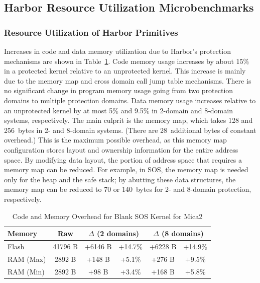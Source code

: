 \subsection{Harbor Resource Utilization Microbenchmarks}
\subsubsection{Resource Utilization of Harbor Primitives}
%
Increases in code and data memory utilization due to Harbor's
protection mechanisms are shown in
Table~\ref{tab:kernel_size_comparison}.
%
Code memory usage increases by about 15\% in a protected kernel
relative to an unprotected kernel.
%
This increase is mainly due to the memory map and cross domain call
jump table mechanisms.
%
There is no significant change in program memory usage going from two
protection domains to multiple protection domains.
%
Data memory usage increases relative to an unprotected kernel by at
most 5\% and 9.5\% in 2-domain and 8-domain systems, respectively.
%
The main culprit is the memory map, which takes 128 and 256~bytes in 2-
and 8-domain systems.  (There are 28~additional bytes of constant
overhead.)
%
This is the maximum possible overhead, as this memory map configuration
stores layout and ownership information for the entire address space.
%
%
By modifying data layout, the portion of address space that requires a
memory map can be reduced.
%
For example, in SOS, the memory map is needed only for the heap and the safe
stack; by abutting these data structures, the memory map can be
reduced to 70 or 140~bytes for 2- and 8-domain protection, respectively.
%
%
\begin{table}[htdp]
\centering
\small{\def\X{\hphantom{0}}
\begin{tabular}{|l|c|c|c|c|c|}
	\hline
	Memory & Raw & \multicolumn{2}{c|}{$\Delta$ (2 domains)} & \multicolumn{2}{c|}{$\Delta$ (8 domains)}
	\\
	\hline
	Flash\raise1pt\hbox{\strut}  & 41796 B & +6146 B & +14.7\% & +6228 B & +14.9\% \\
	RAM (Max) & \X{}2892 B & \X{}+148 B & \X{}+5.1\% & \X{}+276 B &
	\X{}+9.5\% \\
	RAM (Min) & \X{}2892 B & \X{}\X{}+98 B & \X{}+3.4\% & \X{}+168 B &
	\X{}+5.8\% \\
	\hline
\end{tabular}}
\caption{Code and Memory Overhead for Blank SOS Kernel for Mica2}
\label{tab:kernel_size_comparison}
\end{table}
